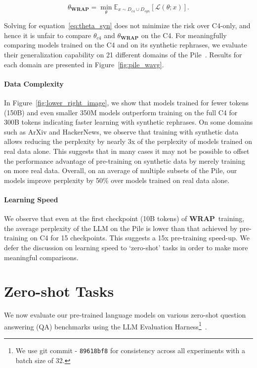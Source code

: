 \documentclass[table]{article}
\def\eqref#1{equation~\ref{#1}}
\newcommand{\ours}{\textbf{WRAP}}
\begin{document}
\begin{equation}
    \theta_{\ours}   = \min_{\theta} \mathbb{E}_{x \sim D_{c4}\cup D_{syn}}\left[ \mathcal{L}(\theta; x) \right] .
    \label{eq:theta_syn}
\end{equation}

Solving for \eqref{eq:theta_syn} does not minimize the risk over C4-only, and hence it is unfair to compare
$\theta_{c4}$ and
$\theta_{\ours}$ on the C4.
For meaningfully comparing models trained on the C4 and on its synthetic rephrases, we evaluate their generalization capability on 21 different domains of the Pile~\citep{gao2020pile}. 
Results for each domain are presented in Figure~\ref{fig:pile_wavg}.

\paragraph{Data Complexity}
In Figure~\ref{fig:lower_right_image}, we show that models trained for fewer tokens (150B) and even smaller 350M models outperform training on the full C4 for 300B tokens indicating faster learning with synthetic rephrases.  
On some domains such as ArXiv and HackerNews, we observe that training with synthetic data allows reducing the perplexity by nearly 3x of the perplexity of models trained on real data alone. This suggests that in many cases 
it may not be possible to offset 
the performance advantage of pre-training on synthetic data
by merely training on more real data.
Overall, on an average of multiple subsets of the Pile,
our models improve perplexity by 50\% over models trained on real data alone. 

\paragraph{Learning Speed}
We observe that even at the first checkpoint (10B tokens) of \ours~training, the average perplexity of the LLM on the Pile is lower than that achieved by pre-training on C4 for 15 checkpoints. This suggests a 15x pre-training speed-up. We defer the discussion on learning speed to  `zero-shot' tasks in order to make more meaningful comparisons. 

\section{Zero-shot Tasks}
We now evaluate our pre-trained language models on various zero-shot question answering (QA) benchmarks
using the LLM Evaluation Harness\footnote{We use git commit - \texttt{89618bf8} for consistency across all experiments with a batch size of 32.}~\citep{eval-harness}.
\end{document}
